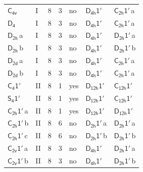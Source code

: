 \documentclass[10pt,a4paper]{article}
\numberwithin{equation}{section}
\newcommand{\grp}[1]{\mathsf{#1}}
\newcommand{\clsletter}[1]{\,{\scriptsize\color{black!55}#1}}
\begin{document}
{\begin{longtable}{@{}llrrlll@{}}
\href{../../../rotation/data/pdf/C4v.pdf}{$\grp{C_{4v}}$} & I & 8 & 3 & no & \href{D4h-1p.pdf}{$\grp{D_{4h}1'}$} & \href{C2h-1p.pdf}{$\grp{C_{2h}1'}$}\clsletter{a}\\
\href{../../../rotation/data/pdf/D4.pdf}{$\grp{D_{4}}$} & I & 8 & 3 & no & \href{D4h-1p.pdf}{$\grp{D_{4h}1'}$} & \href{C2h-1p.pdf}{$\grp{C_{2h}1'}$}\clsletter{a}\\
\href{../../../rotation/data/pdf/D2h.pdf}{$\grp{D_{2h}}$}\clsletter{a} & I & 8 & 3 & no & \href{D4h-1p.pdf}{$\grp{D_{4h}1'}$} & \href{D2h-1p.pdf}{$\grp{D_{2h}1'}$}\clsletter{a}\\
\href{../../../rotation/data/pdf/D2h.pdf}{$\grp{D_{2h}}$}\clsletter{b} & I & 8 & 3 & no & \href{D4h-1p.pdf}{$\grp{D_{4h}1'}$} & \href{D2h-1p.pdf}{$\grp{D_{2h}1'}$}\clsletter{b}\\
\href{../../../rotation/data/pdf/D2d.pdf}{$\grp{D_{2d}}$}\clsletter{a} & I & 8 & 3 & no & \href{D4h-1p.pdf}{$\grp{D_{4h}1'}$} & \href{C2h-1p.pdf}{$\grp{C_{2h}1'}$}\clsletter{a}\\
\href{../../../rotation/data/pdf/D2d.pdf}{$\grp{D_{2d}}$}\clsletter{b} & I & 8 & 3 & no & \href{D4h-1p.pdf}{$\grp{D_{4h}1'}$} & \href{C2h-1p.pdf}{$\grp{C_{2h}1'}$}\clsletter{a}\\
\href{C4-1p.pdf}{$\grp{C_{4}1'}$} & II & 8 & 1 & yes & \href{D12h-1p.pdf}{$\grp{D_{12h}1'}$} & \href{C12h-1p.pdf}{$\grp{C_{12h}1'}$}\\
\href{S4-1p.pdf}{$\grp{S_{4}1'}$} & II & 8 & 1 & yes & \href{D12h-1p.pdf}{$\grp{D_{12h}1'}$} & \href{C12h-1p.pdf}{$\grp{C_{12h}1'}$}\\
\href{C2h-1p.pdf}{$\grp{C_{2h}1'}$}\clsletter{a} & II & 8 & 1 & yes & \href{D12h-1p.pdf}{$\grp{D_{12h}1'}$} & \href{D12h-1p.pdf}{$\grp{D_{12h}1'}$}\\
\href{C2h-1p.pdf}{$\grp{C_{2h}1'}$}\clsletter{b} & II & 8 & 6 & no & \href{D2h-1p.pdf}{$\grp{D_{2h}1'}$}\clsletter{a} & \href{D2h-1p.pdf}{$\grp{D_{2h}1'}$}\clsletter{a}\\
\href{C2h-1p.pdf}{$\grp{C_{2h}1'}$}\clsletter{c} & II & 8 & 6 & no & \href{D2h-1p.pdf}{$\grp{D_{2h}1'}$}\clsletter{b} & \href{D2h-1p.pdf}{$\grp{D_{2h}1'}$}\clsletter{b}\\
\href{C2v-1p.pdf}{$\grp{C_{2v}1'}$}\clsletter{a} & II & 8 & 3 & no & \href{D4h-1p.pdf}{$\grp{D_{4h}1'}$} & \href{D2h-1p.pdf}{$\grp{D_{2h}1'}$}\clsletter{a}\\
\href{C2v-1p.pdf}{$\grp{C_{2v}1'}$}\clsletter{b} & II & 8 & 3 & no & \href{D4h-1p.pdf}{$\grp{D_{4h}1'}$} & \href{D2h-1p.pdf}{$\grp{D_{2h}1'}$}\clsletter{b}\\

\end{longtable}}
\end{document}
